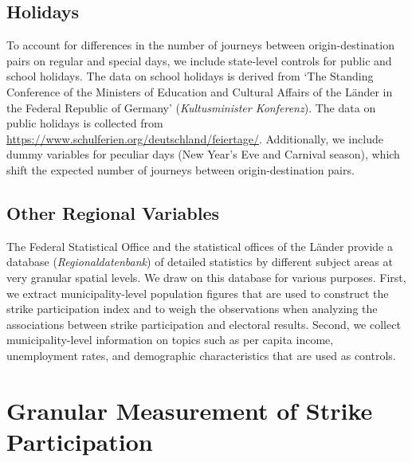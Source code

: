 \subsection{Holidays}
To account for differences in the number of journeys between origin-destination pairs on regular and special days, we include state-level controls for public and school holidays. The data on school holidays is derived from `The Standing Conference of the Ministers of Education and Cultural Affairs of the Länder in the Federal Republic of Germany' (\textit{Kultusminister Konferenz}). The data on public holidays is collected from \url{https://www.schulferien.org/deutschland/feiertage/}. Additionally, we include dummy variables for peculiar days (New Year's Eve and Carnival season), which shift the expected number of journeys between origin-destination pairs.







\subsection{Other Regional Variables}
The Federal Statistical Office and the statistical offices of the Länder provide a database (\textit{Regionaldatenbank}) of detailed statistics by different subject areas at very granular spatial levels. We draw on this database for various purposes. First, we extract municipality-level population figures that are used to construct the strike participation index and to weigh the observations when analyzing the associations between strike participation and electoral results. Second, we collect municipality-level information on topics such as per capita income, unemployment rates, and demographic characteristics that are used as controls.










\newpage
\section{Granular Measurement of Strike Participation}\label{sec_greta_cons:measurement_strike_participation}


